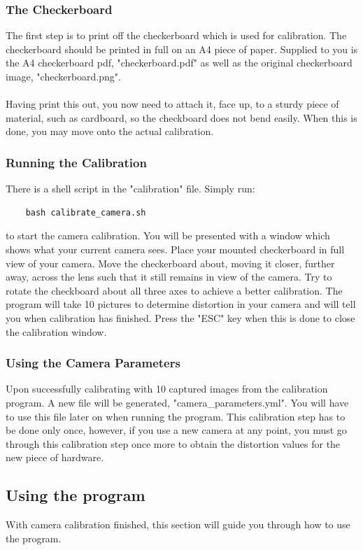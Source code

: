 \documentclass[11pt]{article}
\begin{document}
\subsubsection*{The Checkerboard}
The first step is to print off the checkerboard which is used for 
calibration. The checkerboard should be printed in full  on an
A4 piece of paper. Supplied to you is the A4 checkerboard pdf,
"checkerboard.pdf" as well as the original checkerboard image,
"checkerboard.png".\\
\\
Having print this out, you now need to attach it, face up, to 
a sturdy piece of material, such as cardboard, so the checkboard
does not bend easily. When this is done, you may move onto the 
actual calibration.

\subsubsection*{Running the Calibration}
There is a shell script in the "calibration" file. Simply run:

\begin{verbatim}
	bash calibrate_camera.sh
\end{verbatim}

to start the camera calibration. You will be presented with a 
window which shows what your current camera sees. Place your 
mounted checkerboard in full view of your camera. Move the 
checkerboard about, moving it closer, further away, across the lens such
that it still remains in view of the camera. Try to rotate
the checkboard about all three axes to achieve a better calibration.
The program will take 10 pictures to determine distortion in your 
camera and will tell you when calibration has finished. 
Press the "ESC" key when this is done to close the calibration window.

\subsubsection*{Using the Camera Parameters}
Upon successfully calibrating with 10 captured images from the 
calibration program. A new file will be generated, "camera\_parameters.yml".
You will have to use this file later on when running the program.
This calibration step has to be done only once, however, if you
use a new camera at any point, you must go through this calibration 
step once more to obtain the distortion values for the new piece of
hardware.

\newpage
\subsection{Using the program}
With camera calibration finished, this section will guide you through how
to use the program.
\end{document}
